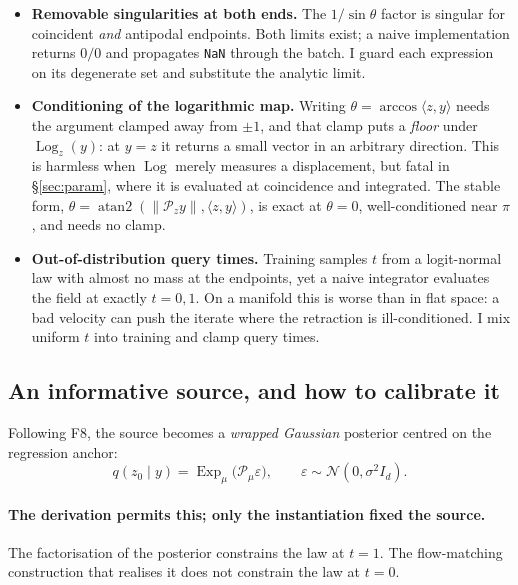 \documentclass[11pt,a4paper]{article}
\newcommand{\Exp}{\operatorname{Exp}}
\newcommand{\Log}{\operatorname{Log}}
\newcommand{\Proj}{\mathcal{P}}
\theoremstyle{plain}
\theoremstyle{remark}
\begin{document}
\begin{itemize}
\item \textbf{Removable singularities at both ends.} The $1/\sin\theta$ factor is
      singular for coincident \emph{and} antipodal endpoints. Both limits exist;
      a naive implementation returns $0/0$ and propagates \texttt{NaN} through
      the batch. I guard each expression on its degenerate set and substitute the
      analytic limit.
\item \textbf{Conditioning of the logarithmic map.} Writing
      $\theta=\arccos\langle z,y\rangle$ needs the argument clamped away from
      $\pm1$, and that clamp puts a \emph{floor} under $\Log_z(y)$: at $y=z$ it
      returns a small vector in an arbitrary direction. This is harmless when
      $\Log$ merely measures a displacement, but fatal in \S\ref{sec:param},
      where it is evaluated at coincidence and integrated. The stable form,
      $\theta=\operatorname{atan2}(\lVert\Proj_z y\rVert, \langle z,y\rangle)$,
      is exact at $\theta=0$, well-conditioned near $\pi$, and needs no clamp.
\item \textbf{Out-of-distribution query times.} Training samples $t$ from a
      logit-normal law with almost no mass at the endpoints, yet a naive
      integrator evaluates the field at exactly $t\!=\!0,1$. On a manifold this
      is worse than in flat space: a bad velocity can push the iterate where the
      retraction is ill-conditioned. I mix uniform $t$ into training and clamp
      query times.
\end{itemize}

\subsection{An informative source, and how to calibrate it}
\label{sec:source}

Following F8, the source becomes a \emph{wrapped Gaussian} posterior centred on
the regression anchor:
\begin{equation}\label{eq:posterior}
q(z_0\mid y)=\Exp_\mu\big(\Proj_\mu\varepsilon\big),\qquad
\varepsilon\sim\mathcal{N}(0,\sigma^2 I_d).
\end{equation}

\paragraph{The derivation permits this; only the instantiation fixed the source.}
The factorisation of the posterior constrains the law at $t\!=\!1$. The
flow-matching construction that realises it does not constrain the law at
$t\!=\!0$.
\end{document}

